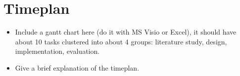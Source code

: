 \chapter{Timeplan}
\label{cha:timeplan}

\begin{itemize}
\item Include a gantt chart here (do it with MS Visio or Excel),
it should have about 10 tasks clustered into about 4 groups:
literature study, design, implementation, evaluation.
\item Give a brief explanation of the timeplan.
\end{itemize}

